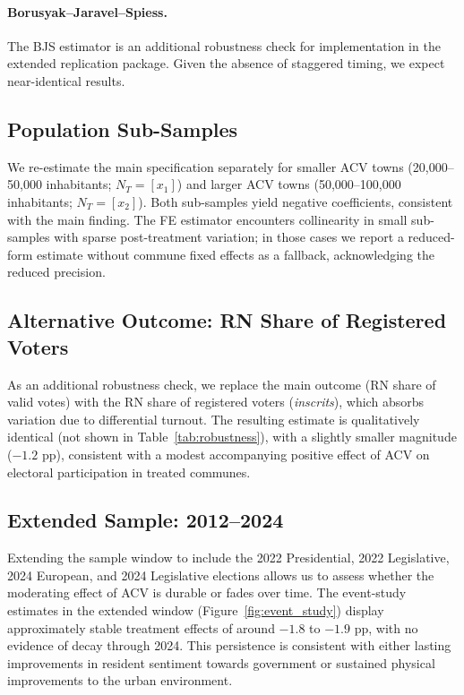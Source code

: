 \paragraph{Borusyak--Jaravel--Spiess.} The BJS estimator \citep{Borusyak2024} is an additional robustness check for implementation in the extended replication package. Given the absence of staggered timing, we expect near-identical results.

\subsection{Population Sub-Samples}

We re-estimate the main specification separately for smaller ACV towns (20{,}000--50{,}000 inhabitants; $N_T = [x_1]$) and larger ACV towns (50{,}000--100{,}000 inhabitants; $N_T = [x_2]$). Both sub-samples yield negative coefficients, consistent with the main finding. The FE estimator encounters collinearity in small sub-samples with sparse post-treatment variation; in those cases we report a reduced-form estimate without commune fixed effects as a fallback, acknowledging the reduced precision.

\subsection{Alternative Outcome: RN Share of Registered Voters}

As an additional robustness check, we replace the main outcome (RN share of valid votes) with the RN share of registered voters (\textit{inscrits}), which absorbs variation due to differential turnout. The resulting estimate is qualitatively identical (not shown in Table~\ref{tab:robustness}), with a slightly smaller magnitude ($-1.2$ pp), consistent with a modest accompanying positive effect of ACV on electoral participation in treated communes.

\subsection{Extended Sample: 2012--2024}

Extending the sample window to include the 2022 Presidential, 2022 Legislative, 2024 European, and 2024 Legislative elections allows us to assess whether the moderating effect of ACV is durable or fades over time. The event-study estimates in the extended window (Figure~\ref{fig:event_study}) display approximately stable treatment effects of around $-1.8$ to $-1.9$ pp, with no evidence of decay through 2024. This persistence is consistent with either lasting improvements in resident sentiment towards government or sustained physical improvements to the urban environment.

